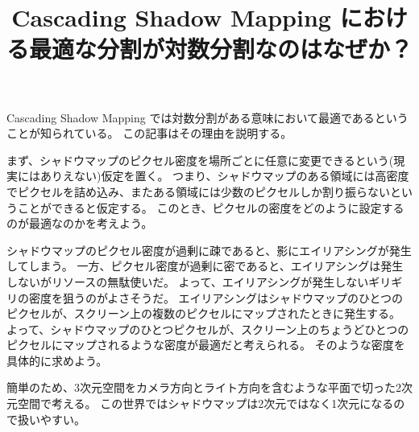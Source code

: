 \documentclass[dvipdfmx,uplatex]{jsarticle}
\title{Cascading Shadow Mapping における最適な分割が対数分割なのはなぜか？}
\begin{document}
\maketitle

Cascading Shadow Mapping では対数分割がある意味において最適であるということが知られている。
この記事はその理由を説明する。

まず、シャドウマップのピクセル密度を場所ごとに任意に変更できるという(現実にはありえない)仮定を置く。
つまり、シャドウマップのある領域には高密度でピクセルを詰め込み、またある領域には少数のピクセルしか割り振らないということができると仮定する。
このとき、ピクセルの密度をどのように設定するのが最適なのかを考えよう。

シャドウマップのピクセル密度が過剰に疎であると、影にエイリアシングが発生してしまう。
一方、ピクセル密度が過剰に密であると、エイリアシングは発生しないがリソースの無駄使いだ。
よって、エイリアシングが発生しないギリギリの密度を狙うのがよさそうだ。
エイリアシングはシャドウマップのひとつのピクセルが、スクリーン上の複数のピクセルにマップされたときに発生する。
よって、シャドウマップのひとつピクセルが、スクリーン上のちょうどひとつのピクセルにマップされるような密度が最適だと考えられる。
そのような密度を具体的に求めよう。

簡単のため、3次元空間をカメラ方向とライト方向を含むような平面で切った2次元空間で考える。
この世界ではシャドウマップは2次元ではなく1次元になるので扱いやすい。
\end{document}

